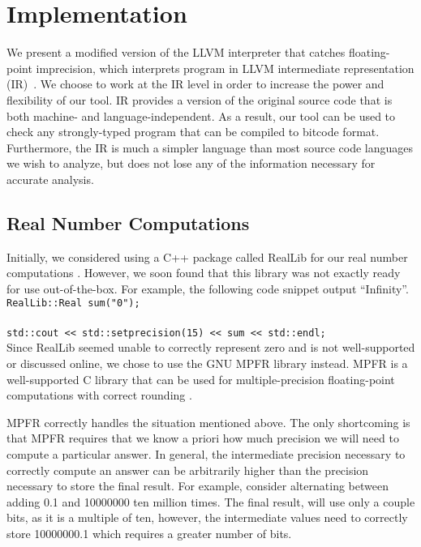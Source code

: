 \section{Implementation}

We present a modified version of the LLVM interpreter that catches floating-point imprecision, which interprets program in LLVM intermediate representation (IR)~\cite{llvmir}. We choose to work at the IR level in order to increase the power and flexibility of our tool. IR provides a version of the original source code that is both machine- and language-independent. As a result, our tool can be used to check any strongly-typed program that can be compiled to bitcode format. Furthermore, the IR is much a simpler language than most source code languages we wish to analyze, but does not lose any of the information necessary for accurate analysis.

\subsection{Real Number Computations}
Initially, we considered using a C++ package called RealLib for our real number computations \cite{reallib}. However, we soon found that this library was not exactly ready for use out-of-the-box. For example, the following code snippet output ``Infinity''.
\\

\texttt{RealLib::Real sum("0");}\\\\
\texttt{std::cout << std::setprecision(15) << sum << std::endl;}
\\

Since RealLib seemed unable to correctly represent zero and is not well-supported or discussed online, we chose to use the GNU MPFR library instead. MPFR is a well-supported C library that can be used for multiple-precision floating-point computations with correct rounding \cite{mpfr}.

MPFR correctly handles the situation mentioned above. The only shortcoming is that MPFR requires that we know a priori how much precision we will need to compute a particular answer. In general, the intermediate precision necessary to correctly compute an answer can be arbitrarily higher than the precision necessary to store the final result. For example, consider alternating between adding 0.1 and 10000000 ten million times. The final result, will use only a couple bits, as it is a multiple of ten, however, the intermediate values need to correctly store 10000000.1 which requires a greater number of bits.

